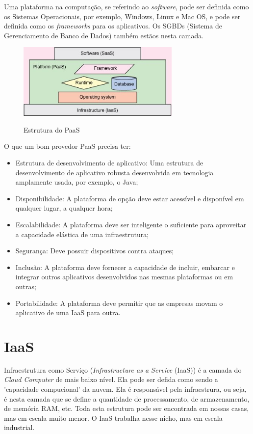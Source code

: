 \documentclass{abnt}
\begin{document}
		Uma plataforma na computação, se referindo ao \textit{software}, pode ser definida como os Sistemas Operacionais, por exemplo, Windows\texttrademark , Linux e Mac OS, e pode ser definida como os \textit{frameworks} para os aplicativos. Os SGBDs (Sistema de Gerenciamento de Banco de Dados) também estãos nesta camada.
	
		\begin{figure}[h]
			\centering
			\includegraphics[width=8cm, keepaspectratio]{img/figure1.jpg}
			\label{fig_paas}
			\caption{Estrutura do PaaS}
		\end{figure}
		
		O que um bom provedor PaaS precisa ter:
			\begin{itemize}
		    \item Estrutura de desenvolvimento de aplicativo: Uma estrutura de desenvolvimento de aplicativo robusta desenvolvida em tecnologia amplamente usada, por exemplo, o Java;
            \item Disponibilidade: A plataforma de opção deve estar acessível e disponível em qualquer lugar, a qualquer hora;
            \item Escalabilidade: A plataforma deve ser inteligente o suficiente para aproveitar a capacidade elástica de uma infraestrutura;
            \item Segurança: Deve possuir dispositivos contra ataques;
            \item Inclusão: A plataforma deve fornecer a capacidade de incluir, embarcar e integrar outros aplicativos desenvolvidos nas mesmas plataformas ou em outras;
            \item Portabilidade: A plataforma deve permitir que as empresas movam o aplicativo de uma IaaS para outra.
		\end{itemize}
		
	\section{IaaS}
		Infraestrutura como Serviço (\textit{Infrastructure as a Service} (IaaS)) é a camada do \textit{Cloud Computer} de mais baixo nível. Ela pode ser defida como sendo a 'capacidade compucional' da nuvem. Ela é responsável pela infraestrura, ou seja, é nesta camada que se define a quantidade de processamento, de armazenamento, de memória RAM, etc. Toda esta estrutura pode ser encontrada em nossas casas, mas em escala muito menor. O IaaS trabalha nesse nicho, mas em escala industrial.
		
\end{document}
